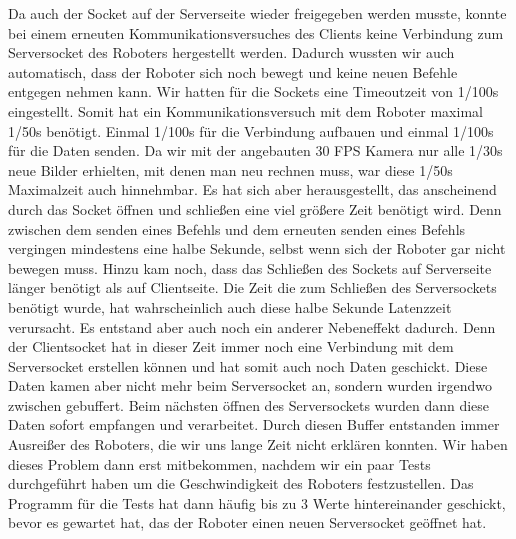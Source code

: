 Da auch der Socket auf der Serverseite wieder freigegeben werden musste, konnte bei einem erneuten Kommunikationsversuches des Clients keine Verbindung zum Serversocket des Roboters hergestellt werden. Dadurch wussten wir auch automatisch, dass der Roboter sich noch bewegt und keine neuen Befehle entgegen nehmen kann. Wir hatten für die Sockets eine Timeoutzeit von 1/100s eingestellt. Somit hat ein Kommunikationsversuch mit dem Roboter maximal 1/50s benötigt. Einmal  1/100s für die Verbindung aufbauen und einmal 1/100s für die Daten senden. Da wir mit der angebauten 30 FPS Kamera nur alle 1/30s neue Bilder erhielten, mit denen man neu rechnen muss, war diese 1/50s Maximalzeit auch hinnehmbar. Es hat sich aber herausgestellt, das anscheinend durch das Socket öffnen und schließen eine viel größere Zeit benötigt wird. Denn zwischen dem senden eines Befehls und dem erneuten senden eines Befehls vergingen mindestens eine halbe Sekunde, selbst wenn sich der Roboter gar nicht bewegen muss. Hinzu kam noch, dass das Schließen des Sockets auf Serverseite länger benötigt als auf Clientseite. Die Zeit die zum Schließen des Serversockets benötigt wurde, hat wahrscheinlich auch diese halbe Sekunde Latenzzeit verursacht. Es entstand aber auch noch ein anderer Nebeneffekt dadurch. Denn der Clientsocket hat in dieser Zeit immer noch eine Verbindung mit dem Serversocket erstellen können und hat somit auch noch Daten geschickt. Diese Daten kamen aber nicht mehr beim Serversocket an, sondern wurden irgendwo zwischen gebuffert. Beim nächsten öffnen des Serversockets wurden dann diese Daten sofort empfangen und verarbeitet. Durch diesen Buffer entstanden immer Ausreißer des Roboters, die wir uns lange Zeit nicht erklären konnten. Wir haben dieses Problem dann erst mitbekommen, nachdem wir ein paar Tests durchgeführt haben um die Geschwindigkeit des Roboters festzustellen. Das Programm für die Tests hat dann häufig bis zu 3 Werte hintereinander geschickt, bevor es gewartet hat, das der Roboter einen neuen Serversocket geöffnet hat. 

